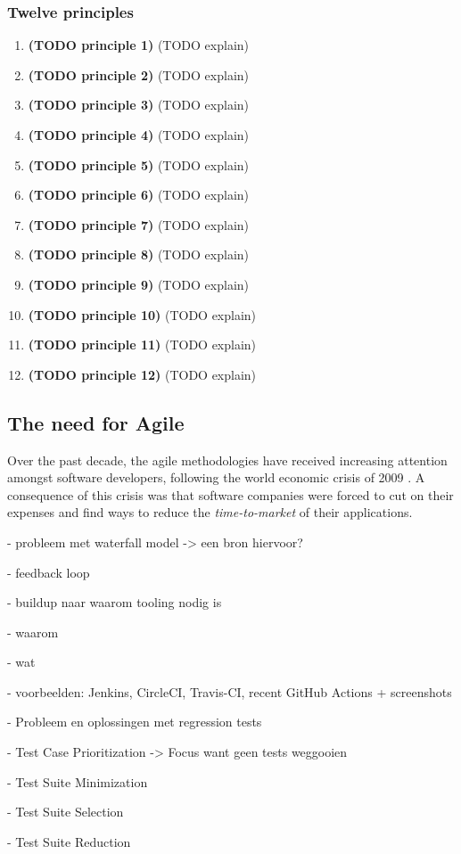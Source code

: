 \subsubsection{Twelve principles}
\begin{enumerate}
	\item \textbf{(TODO principle 1)} (TODO explain)
	\item \textbf{(TODO principle 2)} (TODO explain)
	\item \textbf{(TODO principle 3)} (TODO explain)
	\item \textbf{(TODO principle 4)} (TODO explain)
	\item \textbf{(TODO principle 5)} (TODO explain)
	\item \textbf{(TODO principle 6)} (TODO explain)
	\item \textbf{(TODO principle 7)} (TODO explain)
	\item \textbf{(TODO principle 8)} (TODO explain)
	\item \textbf{(TODO principle 9)} (TODO explain)
	\item \textbf{(TODO principle 10)} (TODO explain)
	\item \textbf{(TODO principle 11)} (TODO explain)
	\item \textbf{(TODO principle 12)} (TODO explain)
\end{enumerate}

\subsection{The need for Agile}
Over the past decade, the agile methodologies have received increasing attention amongst software developers, following the world economic crisis of 2009 \cite{ionel2009}. A consequence of this crisis was that software companies were forced to cut on their expenses and find ways to reduce the \emph{time-to-market} of their applications.

- probleem met waterfall model -> een bron hiervoor?

- feedback loop

- buildup naar waarom tooling nodig is

- waarom

- wat

- voorbeelden: Jenkins, CircleCI, Travis-CI, recent GitHub Actions + screenshots

- Probleem en oplossingen met regression tests

  - Test Case Prioritization -> Focus want geen tests weggooien
  
  - Test Suite Minimization
  
  - Test Suite Selection
  
  - Test Suite Reduction
